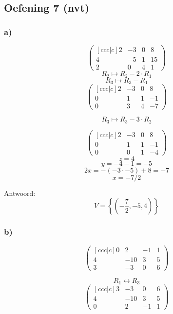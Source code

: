 \documentclass[lineaire_algebra_oplossingen.tex]{subfiles}
\begin{document}
\subsection{Oefening 7 (nvt)}
\subsubsection*{a)}
\[
\begin{pmatrix}[ccc|c]
2 & -3 & 0 & 8\\
4 & -5 & 1 & 15\\
2 & 0 & 4 & 1
\end{pmatrix}
\]
\[ R_2 \longmapsto R_2 - 2\cdot R_1\]
\[ R_3 \longmapsto R_3 -  R_1\]
\[
\begin{pmatrix}[ccc|c]
2 & -3 & 0 & 8\\
0 & 1 & 1 & -1\\
0 & 3 & 4 & -7
\end{pmatrix}
\]

\[ R_3 \longmapsto R_3 - 3\cdot R_2\]

\[
\begin{pmatrix}[ccc|c]
2 & -3 & 0 & 8\\
0 & 1 & 1 & -1\\
0 & 0 & 1 & -4
\end{pmatrix}
\]
\[z = 4\]
\[y = -4-1 = -5\]
\[2x = -(-3\cdot -5) + 8=-7\]
\[ x = -7/2\]

Antwoord:
\[
V = \left\{\left( -\frac{7}{2},-5,4 \right)\right\}
\]

\subsubsection*{b)}
\[
\begin{pmatrix}[ccc|c]
0 & 2 & -1 & 1\\
4 & -10 & 3 & 5\\
3 & -3 & 0 & 6
\end{pmatrix}
\]

\[ R_1 \leftrightarrow R_3\]
\[
\begin{pmatrix}[ccc|c]
3 & -3 & 0 & 6\\
4 & -10 & 3 & 5\\
0 & 2 & -1 & 1
\end{pmatrix}
\]
\end{document}
